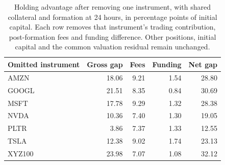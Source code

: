 \begin{table}[htbp]
\centering\small
\caption{Holding advantage after removing one instrument, with shared
collateral and formation at 24 hours, in percentage points of initial
capital. Each row removes that instrument's trading contribution,
post-formation fees and funding difference. Other positions, initial
capital and the common valuation residual remain unchanged.}
\label{tab:feedbackinstrument}
\begin{tabular}{lrrrr}
\toprule
Omitted instrument & Gross gap & Fees & Funding & Net gap \\
\midrule
AMZN & 18.06 & 9.21 & 1.54 & 28.80 \\
GOOGL & 21.51 & 8.35 & 0.84 & 30.69 \\
MSFT & 17.78 & 9.29 & 1.32 & 28.38 \\
NVDA & 10.36 & 7.40 & 1.30 & 19.05 \\
PLTR & 3.86 & 7.37 & 1.33 & 12.55 \\
TSLA & 12.38 & 9.02 & 1.74 & 23.13 \\
XYZ100 & 23.98 & 7.07 & 1.08 & 32.12 \\
\bottomrule
\end{tabular}
\end{table}
